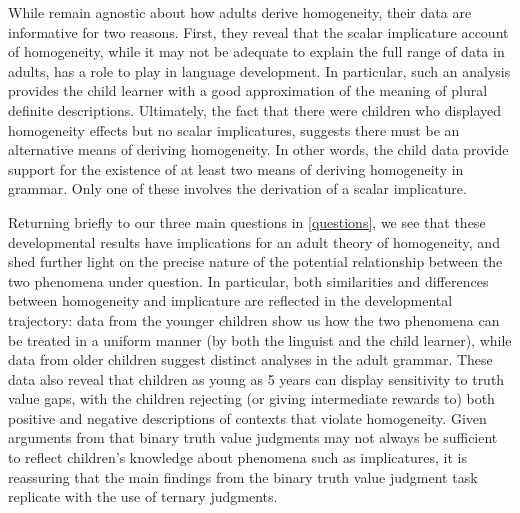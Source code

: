 \documentclass[12pt, letterpaper]{article}
\begin{document}
{%



While \cite{Tieu:2015i,Tieu:2015k} remain agnostic about how adults derive homogeneity, their data are informative for two reasons. First, they reveal that the scalar implicature account of homogeneity, while it may not be adequate to explain the full range of data in adults, has a role to play in language development. In particular, such an analysis provides the child learner with a good approximation of the meaning of plural definite descriptions. Ultimately, the fact that there were children who displayed homogeneity effects but no scalar implicatures, suggests there must be an alternative means of deriving homogeneity. In other words, the child data provide support for the existence of at least two means of deriving homogeneity in grammar. Only one of these involves the derivation of a scalar implicature.

Returning briefly to our three main questions in \ref{questions}, we see that these developmental results have implications for an adult theory of homogeneity, and shed further light on the precise nature of the potential relationship between the two phenomena under question. In particular, both similarities and differences between homogeneity and implicature are reflected in the developmental trajectory: data from the younger children show us how the two phenomena can be treated in a uniform manner (by both the linguist and the child learner), while data from older children suggest distinct analyses in the adult grammar. These data also reveal that children as young as 5 years can display sensitivity to truth value gaps, with the children rejecting (or giving intermediate rewards to) both positive and negative descriptions of contexts that violate homogeneity. Given arguments from \cite{Katsos:2011} that binary truth value judgments may not always be sufficient to reflect children's knowledge about phenomena such as implicatures, it is reassuring that the main findings from the binary truth value judgment task replicate with the use of ternary judgments.


}
\end{document}
